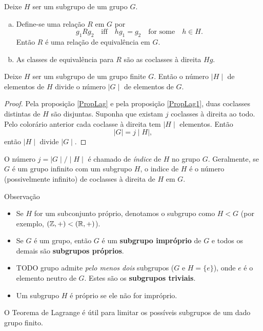 \begin{stat}\label{PropLag}
  Deixe $H$ ser um subgrupo de um grupo $G$.
  \begin{enumerate}[a.]
    \item Define-se uma relação $R$ em $G$ por $$ g_{1} R g_{2}\quad \textrm{iff}\quad hg_{1} = g_{2}\quad \textrm{for\ some}\quad h\in H.$$ Então $R$ é uma relação de equivalência em $G$.
    \item As classes de equivalência para $R$ são as coclasses à direita $Hg$.
  \end{enumerate}
\end{stat}

\begin{theorem}
  Deixe $H$ ser um subgrupo de um grupo finite $G$. Então o número $\mid H\mid$ de elementos de $H$ divide o número $\mid G\mid$ de elementos de $G$.
  \begin{proof}
    Pela proposição \ref{PropLag} e pela proposição \ref{PropLag1}, duas coclasses distintas de $H$ são disjuntas. Suponha que existam $j$ coclasses à direita ao todo. Pelo colorário anterior cada coclasse à direita tem $\mid H \mid$ elementos. Então
    $$ \mid G\mid = j\mid H\mid,$$ então $\mid H \mid $ divide $\mid G \mid $.
  \end{proof}
\end{theorem}

O número $j = \mid G\mid / \mid H\mid$ é chamado de \emph{índice} de $H$ no grupo $G$. Geralmente, se $G$ é um grupo infinito com um subgrupo $H$, o indice de $H$ é o número (possivelmente infinito) de coclasses à direita de $H$ em $G$.
\begin{mymdframed}{Observação}
  \begin{itemize}
    \item Se $H$ for um subconjunto próprio, denotamos o subgrupo como $H < G$ (por exemplo, $(\mathbb{Z}, +) < (\mathbb{R}, +)$).
    \item Se $G$ é um grupo, então $G$ é um \textbf{subgrupo impróprio} de $G$ e todos os demais são \textbf{subgrupos próprios}. 
    \item TODO grupo admite \emph{pelo menos dois} subgrupos ($G$ e $H = \{e\}$), onde $e$ é o elemento neutro de $G$. Estes são os \textbf{subgrupos triviais}.
    \item Um subgrupo $H$ é próprio se ele não for impróprio.
  \end{itemize}
\end{mymdframed}
O Teorema de Lagrange é útil para limitar os possíveis subgrupos de um dado grupo finito.

